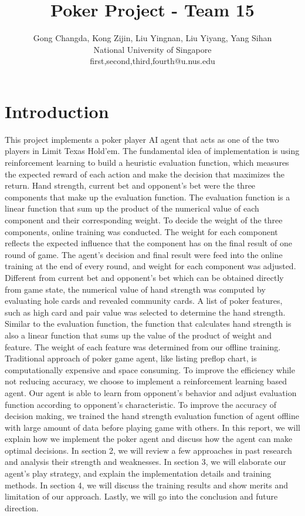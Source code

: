 \documentclass{article}
\title{Poker Project - Team 15}
\author{
Gong Changda, Kong Zijin, Liu Yingnan, Liu Yiyang, Yang Sihan
\\ 
National University of Singapore\\
%
first,second,third,fourth@u.nus.edu
}
\begin{document}
\maketitle

\section{Introduction}

This project implements a poker player AI agent that acts as one of the two players in Limit Texas Hold’em. The fundamental idea of implementation is using reinforcement learning to build a heuristic evaluation function, which measures the expected reward of each action and make the decision that maximizes the return. Hand strength, current bet and opponent’s bet were the three components that make up the evaluation function. The evaluation function is a linear function that sum up the product of the numerical value of each component and their corresponding weight. To decide the weight of the three components, online training was conducted. The weight for each component reflects the expected influence that the component has on the final result of one round of game. The agent’s decision and final result were feed into the online training at the end of every round, and weight for each component was adjusted. Different from current bet and opponent’s bet which can be obtained directly from game state, the numerical value of hand strength was computed by evaluating hole cards and revealed community cards. A list of poker features, such as high card and pair value was selected to determine the hand strength. Similar to the evaluation function, the function that calculates hand strength is also a linear function that sums up the value of the product of weight and feature. The weight of each feature was determined from our offline training. Traditional approach of poker game agent, like listing preflop chart, is computationally expensive and space consuming. To improve the efficiency while not reducing accuracy, we choose to implement a reinforcement learning based agent. Our agent is able to learn from opponent’s behavior and adjust evaluation function according to opponent’s characteristic. To improve the accuracy of decision making, we trained the hand strength evaluation function of agent offline with large amount of data before playing game with others. In this report, we will explain how we implement the poker agent and discuss how the agent can make optimal decisions. In section 2, we will review a few approaches in past research and analysis their strength and weaknesses. In section 3, we will elaborate our agent’s play strategy, and explain the implementation details and training methods. In section 4, we will discuss the training results and show merits and limitation of our approach. Lastly, we will go into the conclusion and future direction.   
\end{document}
